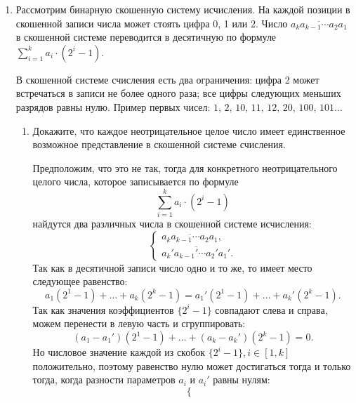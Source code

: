 \begin{enumerate}
  \item
    Рассмотрим бинарную скошенную систему исчисления. На каждой
    позиции в скошенной записи числа может стоять цифра 0, 1 или
    2. Число $\overline{a_k a_{k-1} \cdots a_2 a_1}$ в скошенной системе
    переводится в десятичную по формуле $\sum_{i = 1}^k a_i \cdot (2^i - 1)$.

    В скошенной системе счисления есть два ограничения: цифра 2 может
    встречаться в записи не более одного раза; все цифры следующих
    меньших разрядов равны нулю.  Пример первых чисел:
    $1,\,2,\,10,\,11,\,12,\,20,\,100,\,101\dots$

    \begin{enumerate}
      \item Докажите, что каждое неотрицательное целое число имеет
        единственное возможное представление в скошенной системе счисления.
      \begin{solution}
        Предположим, что это не так, тогда для конкретного неотрицательного целого числа, которое записывается по формуле
        \begin{equation}
          \sum_{i = 1}^k a_i \cdot (2^i - 1)
        \end{equation}
        найдутся два различных числа в скошенной системе исчисления:
        \begin{equation}
          \begin{cases}
            \overline{a_k a_{k-1} \cdots a_2 a_1}, \\
            \overline{a_k' a_{k-1}' \cdots a_2' a_1'}.
          \end{cases}
        \end{equation}
        Так как в десятичной записи число одно и то же, то имеет место следующее равенство:
        \begin{equation}
          a_1(2^1-1)+\ldots+a_k(2^k-1) = a_1'(2^1-1)+\ldots+a_k'(2^k-1).
        \end{equation}
        Так как значения коэффициентов $\{2^i-1\}$ совпадают слева и справа, можем перенести в левую часть и сгруппировать:
        \begin{equation}
          (a_1-a_1')(2^1-1)+\ldots+(a_k-a_k')(2^k-1) = 0.
        \end{equation}
        Но числовое значение каждой из скобок $\{2^i-1\}, i \in [1, k]$ положительно, поэтому равенство нулю может достигаться тогда и только тогда, когда разности параметров $a_i$ и $a_i'$ равны нулям:
        \begin{equation}
          \begin{cases}

\end{cases}
\end{equation}
\end{solution}
\end{enumerate}
\end{enumerate}
